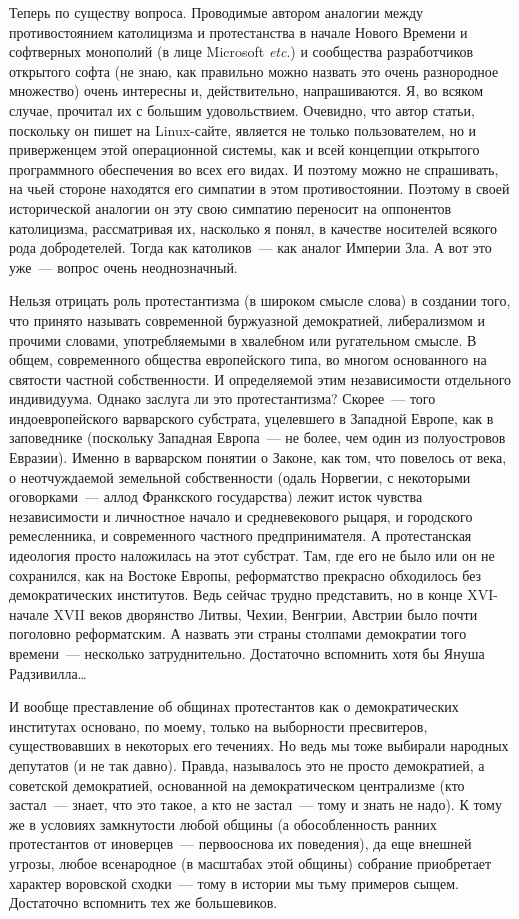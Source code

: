 Теперь по существу вопроса. Проводимые автором аналогии между противостоянием католицизма и протестанства в начале Нового Времени и софтверных монополий (в лице Microsoft \textit{etc}.) и сообщества разработчиков открытого софта (не знаю, как правильно можно назвать это очень разнородное множество) очень интересны и, действительно, напрашиваются. Я, во всяком случае, прочитал их с большим удовольствием. Очевидно, что автор статьи, поскольку он пишет на Linux-сайте, является не только пользователем, но и приверженцем этой операционной системы, как и всей концепции открытого программного обеспечения во всех его видах. И поэтому можно не спрашивать, на чьей стороне находятся его симпатии в этом противостоянии. Поэтому в своей исторической аналогии он эту свою симпатию переносит на оппонентов католицизма, рассматривая их, насколько я понял, в качестве носителей всякого рода добродетелей. Тогда как католиков~--- как аналог Империи Зла. А вот это уже~--- вопрос очень неоднозначный. 

Нельзя отрицать роль протестантизма (в широком смысле слова) в создании того, что принято называть современной буржуазной демократией, либерализмом и прочими словами, употребляемыми в хвалебном или ругательном смысле. В общем, современного общества европейского типа, во многом основанного на святости частной собственности. И определяемой этим независимости отдельного индивидуума. Однако заслуга ли это протестантизма? Скорее~--- того индоевропейского варварского субстрата, уцелевшего в Западной Европе, как в заповеднике (поскольку Западная Европа~--- не более, чем один из полуостровов Евразии). Именно в варварском понятии о Законе, как том, что повелось от века, о неотчуждаемой земельной собственности (одаль Норвегии, с некоторыми оговорками~--- аллод Франкского государства) лежит исток чувства независимости и личностное начало и средневекового рыцаря, и городского ремесленника, и современного частного предпринимателя. А протестанская идеология просто наложилась на этот субстрат. Там, где его не было или он не сохранился, как на Востоке Европы, реформатство прекрасно обходилось без демократических институтов. Ведь сейчас трудно представить, но в конце XVI- начале XVII веков дворянство Литвы, Чехии, Венгрии, Австрии было почти поголовно реформатским. А назвать эти страны столпами демократии того времени~--- несколько затруднительно. Достаточно вспомнить хотя бы Януша Радзивилла\dots 

И вообще преставление об общинах протестантов как о демократических институтах основано, по моему, только на выборности пресвитеров, существовавших в некоторых его течениях. Но ведь мы тоже выбирали народных депутатов (и не так давно). Правда, называлось это не просто демократией, а советской демократией, основанной на демократическом централизме (кто застал~--- знает, что это такое, а кто не застал~--- тому и знать не надо). К тому же в условиях замкнутости любой общины (а обособленность ранних протестантов от иноверцев~--- первооснова их поведения), да еще внешней угрозы, любое всенародное (в масштабах этой общины) собрание приобретает характер воровской сходки~--- тому в истории мы тьму примеров сыщем. Достаточно вспомнить тех же большевиков. 

